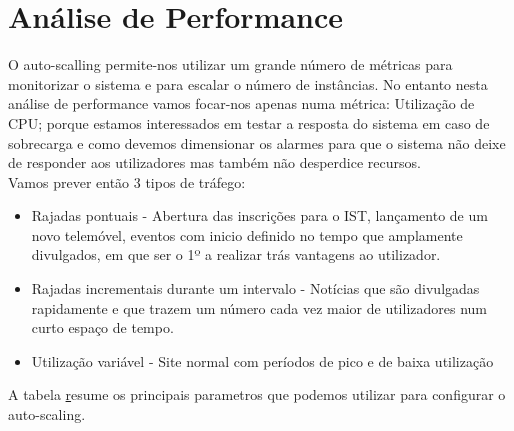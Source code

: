 \section{Análise de Performance}
O auto-scalling permite-nos utilizar um grande número de métricas para monitorizar o sistema e para escalar o número de instâncias. No entanto nesta análise de performance vamos focar-nos apenas numa métrica: Utilização de CPU; porque estamos interessados em testar a resposta do sistema em caso de sobrecarga e como devemos dimensionar os alarmes para que o sistema não deixe de responder aos utilizadores mas também não desperdice recursos. \\
Vamos prever então 3 tipos de tráfego:
   \begin{itemize}
\item Rajadas pontuais - Abertura das inscrições para o IST, lançamento de um novo telemóvel, eventos com inicio definido no tempo que amplamente divulgados, em que ser o 1º a realizar trás vantagens ao utilizador.
\item Rajadas incrementais durante um intervalo - Notícias que são divulgadas rapidamente e que trazem um número cada vez maior de utilizadores num curto espaço de tempo.
\item Utilização variável - Site normal com períodos de pico e de baixa utilização\end{itemize}

A tabela \href{table:Parametros} resume os principais parametros que podemos utilizar para configurar o auto-scaling.

